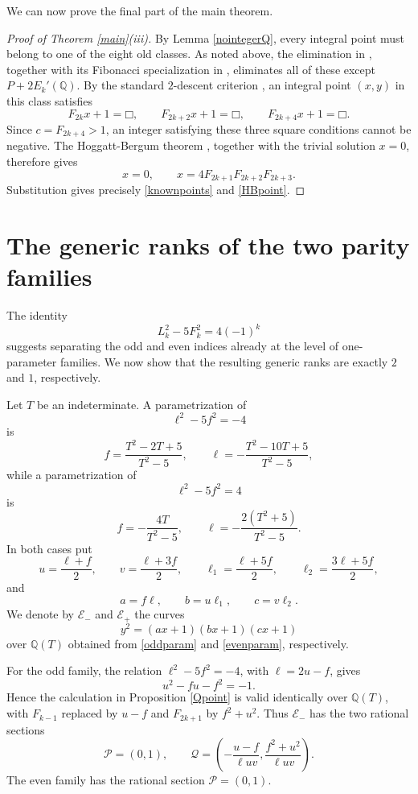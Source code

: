 \documentclass[11pt]{amsart}
\theoremstyle{remark}
\newcommand{\Q}{\mathbb{Q}}
\newcommand{\sq}{\mathord{\Box}}
\begin{document}
We can now prove the final part of the main theorem.

\begin{proof}[Proof of Theorem \ref{main}(iii)]
By Lemma \ref{nointegerQ}, every integral point must belong to one of
the eight old classes.  As noted above, the elimination in
\cite[Theorem 4]{DujellaMT}, together with its Fibonacci specialization
in \cite[Theorem 6]{DujellaMT}, eliminates all of these except
$P+2E_k'(\Q)$.  By the standard $2$-descent criterion
\cite[Proposition 1]{DujellaMT}, an integral point $(x,y)$ in this
class satisfies
\[
 F_{2k}x+1=\sq,\qquad
 F_{2k+2}x+1=\sq,\qquad
 F_{2k+4}x+1=\sq.
\]
Since $c=F_{2k+4}>1$, an integer satisfying these three square
conditions cannot be negative.  The Hoggatt-Bergum theorem
\cite{DujellaHB}, together with the trivial solution $x=0$, therefore
gives
\[
 x=0,\qquad
 x=4F_{2k+1}F_{2k+2}F_{2k+3}.
\]
Substitution gives precisely \eqref{knownpoints} and \eqref{HBpoint}.
\end{proof}


\section{The generic ranks of the two parity families}\label{generic}

The identity
\[
 L_k^2-5F_k^2=4(-1)^k
\]
suggests separating the odd and even indices already at the level of
one-parameter families.  We now show that the resulting generic ranks
are exactly $2$ and $1$, respectively.

Let $T$ be an indeterminate.  A parametrization of
\[
 \ell^2-5f^2=-4
\]
is
\begin{equation}\label{oddparam}
 f=\frac{T^2-2T+5}{T^2-5},\qquad
 \ell=-\frac{T^2-10T+5}{T^2-5},
\end{equation}
while a parametrization of
\[
 \ell^2-5f^2=4
\]
is
\begin{equation}\label{evenparam}
 f=-\frac{4T}{T^2-5},\qquad
 \ell=-\frac{2(T^2+5)}{T^2-5}.
\end{equation}
In both cases put
\[
 u=\frac{\ell+f}{2},\qquad
 v=\frac{\ell+3f}{2},\qquad
 \ell_1=\frac{\ell+5f}{2},\qquad
 \ell_2=\frac{3\ell+5f}{2},
\]
and
\[
 a=f\ell,\qquad b=u\ell_1,\qquad c=v\ell_2.
\]
We denote by $\mathcal E_-$ and $\mathcal E_+$ the curves
\[
 y^2=(ax+1)(bx+1)(cx+1)
\]
over $\Q(T)$ obtained from \eqref{oddparam} and \eqref{evenparam},
respectively.

For the odd family, the relation $\ell^2-5f^2=-4$, with
$\ell=2u-f$, gives
\[
 u^2-fu-f^2=-1.
\]
Hence the calculation in Proposition \ref{Qpoint} is valid identically
over $\Q(T)$, with $F_{k-1}$ replaced by $u-f$ and
$F_{2k+1}$ by $f^2+u^2$.  Thus $\mathcal E_-$ has the two rational
sections
\[
 \mathcal P=(0,1),\qquad
 \mathcal Q=
 \left(-\frac{u-f}{\ell uv},
       \frac{f^2+u^2}{\ell uv}\right).
\]
The even family has the rational section $\mathcal P=(0,1)$.
\end{document}
